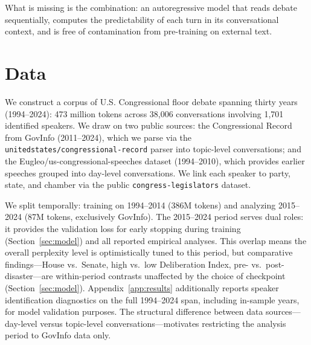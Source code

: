 \documentclass[12pt]{article}
\begin{document}
What is missing is the combination: an autoregressive model that reads debate sequentially, computes the predictability of each turn in its conversational context, and is free of contamination from pre-training on external text.


\section{Data}

We construct a corpus of U.S. Congressional floor debate spanning thirty years (1994--2024): 473 million tokens across 38,006 conversations involving 1,701 identified speakers. We draw on two public sources: the Congressional Record from GovInfo \citep{govinfo} (2011--2024), which we parse via the \texttt{unitedstates/\allowbreak{}congressional-record} parser \citep{unitedstates_parser} into topic-level conversations; and the Eugleo/\allowbreak{}us-congressional-speeches dataset \citep{eugleo2023} (1994--2010), which provides earlier speeches grouped into day-level conversations. We link each speaker to party, state, and chamber via the public \texttt{congress-legislators} dataset.

We split temporally: training on 1994--2014 (386M tokens) and analyzing 2015--2024 (87M tokens, exclusively GovInfo). The 2015--2024 period serves dual roles: it provides the validation loss for early stopping during training (Section~\ref{sec:model}) and all reported empirical analyses. This overlap means the overall perplexity level is optimistically tuned to this period, but comparative findings---House vs.\ Senate, high vs.\ low Deliberation Index, pre- vs.\ post-disaster---are within-period contrasts unaffected by the choice of checkpoint (Section~\ref{sec:model}). Appendix~\ref{app:results} additionally reports speaker identification diagnostics on the full 1994--2024 span, including in-sample years, for model validation purposes. The structural difference between data sources---day-level versus topic-level conversations---motivates restricting the analysis period to GovInfo data only.
\end{document}
